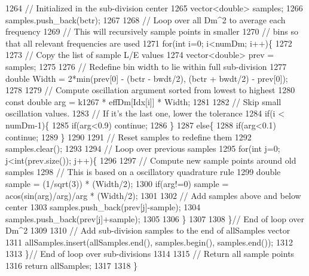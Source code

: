 \begin{DoxyCode}
1264     \textcolor{comment}{// Initialized in the sub-division center}
1265     vector<double> samples;
1266     samples.push\_back(bctr);
1267 
1268     \textcolor{comment}{// Loop over all Dm^2 to average each frequency}
1269     \textcolor{comment}{// This will recursively sample points in smaller}
1270     \textcolor{comment}{// bins so that all relevant frequencies are used}
1271     \textcolor{keywordflow}{for}(\textcolor{keywordtype}{int} i=0; i<numDm; i++)\{
1272 
1273       \textcolor{comment}{// Copy the list of sample L/E values}
1274       vector<double> prev = samples;
1275 
1276       \textcolor{comment}{// Redefine bin width to lie within full sub-division}
1277       \textcolor{keywordtype}{double} Width = 2*min(prev[0] - (bctr - bwdt/2), (bctr + bwdt/2) - prev[0]);
1278 
1279       \textcolor{comment}{// Compute oscillation argument sorted from lowest  to highest}
1280       \textcolor{keyword}{const} \textcolor{keywordtype}{double} arg = k1267 * effDm[Idx[i]] * Width;
1281 
1282       \textcolor{comment}{// Skip small oscillation values.}
1283       \textcolor{comment}{// If it's the last one, lower the tolerance}
1284       \textcolor{keywordflow}{if}(i < numDm-1)\{
1285         \textcolor{keywordflow}{if}(arg<0.9) \textcolor{keywordflow}{continue};
1286       \}
1287       \textcolor{keywordflow}{else}\{
1288         \textcolor{keywordflow}{if}(arg<0.1) \textcolor{keywordflow}{continue};
1289       \}
1290 
1291       \textcolor{comment}{// Reset samples to redefine them}
1292       samples.clear();
1293 
1294       \textcolor{comment}{// Loop over previous samples}
1295       \textcolor{keywordflow}{for}(\textcolor{keywordtype}{int} j=0; j<int(prev.size()); j++)\{
1296 
1297         \textcolor{comment}{// Compute new sample points around old samples}
1298         \textcolor{comment}{// This is based on a oscillatory quadrature rule}
1299         \textcolor{keywordtype}{double} sample = (1/sqrt(3)) * (Width/2);
1300         \textcolor{keywordflow}{if}(arg!=0) sample = acos(sin(arg)/arg)/arg * (Width/2);
1301 
1302         \textcolor{comment}{// Add samples above and below center}
1303         samples.push\_back(prev[j]-sample);
1304         samples.push\_back(prev[j]+sample);
1305 
1306       \}
1307 
1308     \}\textcolor{comment}{// End of loop over Dm^2}
1309 
1310     \textcolor{comment}{// Add sub-division samples to the end of allSamples vector}
1311     allSamples.insert(allSamples.end(), samples.begin(), samples.end());
1312 
1313   \}\textcolor{comment}{// End of loop over sub-divisions}
1314 
1315   \textcolor{comment}{// Return all sample points}
1316   \textcolor{keywordflow}{return} allSamples;
1317 
1318 \}
\end{DoxyCode}
\mbox{\label{classOscProb_1_1PMNS__Base_adf23b569112f9f9e0e592f01d79a5f3d}} 
